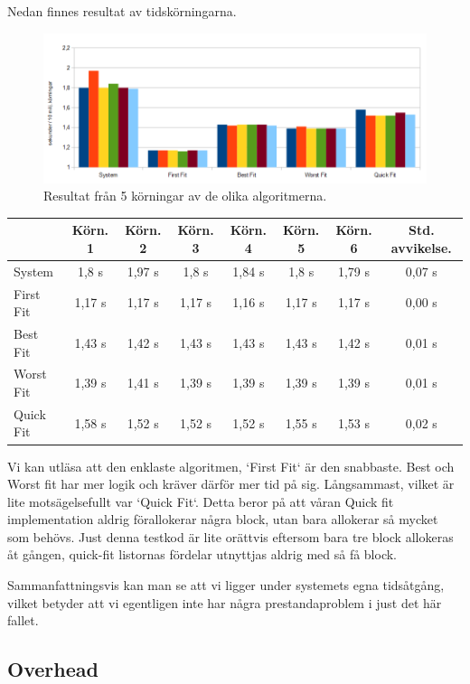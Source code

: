 \documentclass[a4paper,10pt,titlepage]{article}
\begin{document}
Nedan finnes resultat av tidskörningarna.
\begin{figure}[H]
	\includegraphics[width=\textwidth]{time.png}
	\caption{Resultat från 5 körningar av de olika algoritmerna.}
\end{figure}
\begin{tabular}{| l | c | c | c | c | c | c | c |}
		\hline
		 & Körn. 1	& Körn. 2	& Körn. 3	& Körn. 4	& Körn. 5	& Körn. 6	& Std. avvikelse. \\
		\hline
		System		& 1,8 s			& 1,97 s	& 1,8 s		& 1,84 s	& 1,8 s		& 1,79 s	& 0,07 s \\
		First Fit	& 1,17 s		& 1,17 s	& 1,17 s	& 1,16 s	& 1,17 s	& 1,17 s	& 0,00 s \\
		Best Fit	& 1,43 s		& 1,42 s	& 1,43 s	& 1,43 s	& 1,43 s	& 1,42 s	& 0,01 s \\
		Worst Fit	& 1,39 s		& 1,41 s	& 1,39 s	& 1,39 s	& 1,39 s	& 1,39 s	& 0,01 s \\
		Quick Fit	& 1,58 s		& 1,52 s	& 1,52 s	& 1,52 s	& 1,55 s	& 1,53 s	& 0,02 s \\
		\hline
\end{tabular}

Vi kan utläsa att den enklaste algoritmen, `First Fit` är den snabbaste. Best och Worst fit har mer logik och kräver därför mer tid på sig. Långsammast, vilket är lite motsägelsefullt var `Quick Fit`. Detta beror på att våran Quick fit implementation aldrig förallokerar några block, utan bara allokerar så mycket som behövs. Just denna testkod är lite orättvis eftersom bara tre block allokeras åt gången, quick-fit listornas fördelar utnyttjas aldrig med så få block.


Sammanfattningsvis kan man se att vi ligger under systemets egna tidsåtgång, vilket betyder att vi egentligen inte har några prestandaproblem i just det här fallet.

\subsection{Overhead}
\end{document}
